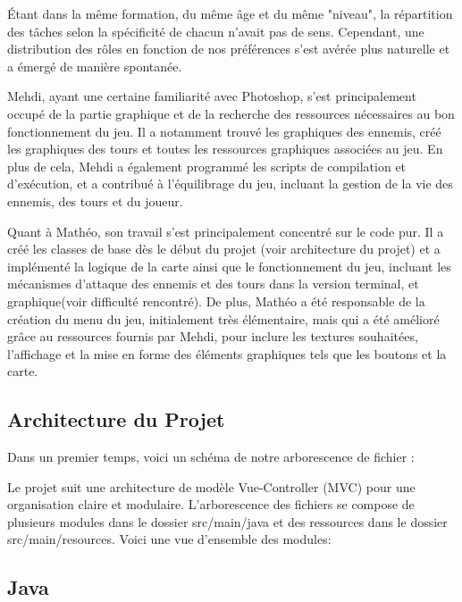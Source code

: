 \documentclass{article}
\begin{document}
Étant dans la même formation, du même âge et du même "niveau", la répartition des tâches selon la spécificité de chacun n'avait pas de sens. Cependant, une distribution des rôles en fonction de nos préférences s'est avérée plus naturelle et a émergé de manière spontanée.

Mehdi, ayant une certaine familiarité avec Photoshop, s'est principalement occupé de la partie graphique et de la recherche des ressources nécessaires au bon fonctionnement du jeu. Il a notamment trouvé les graphiques des ennemis, créé les graphiques des tours et toutes les ressources graphiques associées au jeu. En plus de cela, Mehdi a également programmé les scripts de compilation et d'exécution, et a contribué à l'équilibrage du jeu, incluant la gestion de la vie des ennemis, des tours et du joueur.

Quant à Mathéo, son travail s'est principalement concentré sur le code pur. Il a créé les classes de base dès le début du projet (voir architecture du projet) et a implémenté la logique de la carte ainsi que le fonctionnement du jeu, incluant les mécanismes d'attaque des ennemis et des tours dans la version terminal, et graphique(voir difficulté rencontré). De plus, Mathéo a été responsable de la création du menu du jeu, initialement très élémentaire, mais qui a été amélioré grâce au ressources fournis par Mehdi, pour inclure les textures souhaitées, l'affichage et la mise en forme des éléments graphiques tels que les boutons et la carte.


\subsection{Architecture du Projet}
Dans un premier temps, voici un schéma de notre arborescence de fichier : 

Le projet suit une architecture de modèle Vue-Controller (MVC) pour une organisation claire et modulaire. L'arborescence des fichiers se compose de plusieurs modules dans le dossier src/main/java et des ressources dans le dossier src/main/resources. Voici une vue d'ensemble des modules:

\subsection*{Java}
\end{document}
